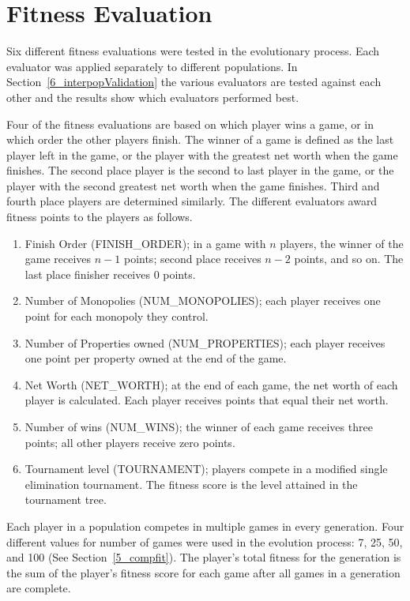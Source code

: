 \section{Fitness Evaluation} \label{5_fitnesseval}

Six different fitness evaluations were tested in the evolutionary process. Each
evaluator was applied separately to different populations. In 
Section~\ref{6_interpopValidation} the various evaluators are tested against 
each other and the results show which evaluators performed best.

Four of the fitness evaluations are based on which player wins a game, or in
which order the other players finish. The winner of a game is defined as the
last player left in the game, or the player with the greatest net worth when the
game finishes. The second place player is the second to last player in the game,
or the player with the second greatest net worth when the game finishes. Third
and fourth place players are determined similarly. The different evaluators
award fitness points to the players as follows.

\begin{enumerate}
  \item {Finish Order (FINISH\_ORDER); in a game with \(n\) players, the winner
  of the game receives \(n-1\) points; second place receives \(n-2\) points, and
  so on. The last place finisher receives 0 points.}
  \item {Number of Monopolies (NUM\_MONOPOLIES); each player receives one
  point for each monopoly they control.}
  \item {Number of Properties owned (NUM\_PROPERTIES); each player receives one
  point per property owned at the end of the game.}
  \item {Net Worth (NET\_WORTH); at the end of each game, the net worth of each
  player is calculated. Each player receives points that equal their net
  worth.}
  \item {Number of wins (NUM\_WINS); the winner of each game receives three
  points; all other players receive zero points.}
  \item {Tournament level (TOURNAMENT); players compete in a modified single
  elimination tournament. The fitness score is the level attained in the
  tournament tree.}
\end{enumerate}

Each player in a population competes in multiple games in every generation. Four
different values for number of games were used in the evolution process: 7, 25,
50, and 100 (See Section~\ref{5_compfit}). The player's total fitness for the
generation is the sum of the player's fitness score for each game after all
games in a generation are complete.

